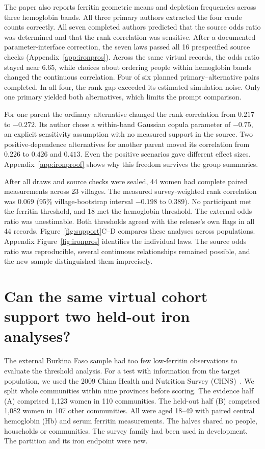 \documentclass[sigconf,anonymous,review]{acmart}
\begin{document}
The paper also reports ferritin geometric means and depletion frequencies across three hemoglobin bands. All three primary authors extracted the four crude counts correctly. All seven completed authors predicted that the source odds ratio was determined and that the rank correlation was sensitive. After a documented parameter-interface correction, the seven laws passed all 16 prespecified source checks (Appendix~\ref{app:ironpros}). Across the same virtual records, the odds ratio stayed near 6.65, while choices about ordering people within hemoglobin bands changed the continuous correlation. Four of six planned primary--alternative pairs completed. In all four, the rank gap exceeded its estimated simulation noise. Only one primary yielded both alternatives, which limits the prompt comparison.


For one parent the ordinary alternative changed the rank correlation from $0.217$ to $-0.272$. Its author chose a within-band Gaussian copula parameter of $-0.75$, an explicit sensitivity assumption with no measured support in the source. Two positive-dependence alternatives for another parent moved its correlation from $0.226$ to $0.426$ and $0.413$. Even the positive scenarios gave different effect sizes. Appendix~\ref{app:ironproof} shows why this freedom survives the group summaries.

After all draws and source checks were sealed, 44 women had complete paired measurements across 23 villages. The measured survey-weighted rank correlation was 0.069 (95\% village-bootstrap interval $-0.198$ to $0.389$). No participant met the ferritin threshold, and 18 met the hemoglobin threshold. The external odds ratio was unestimable. Both thresholds agreed with the release's own flags in all 44 records. Figure~\ref{fig:support}C--D compares these analyses across populations. Appendix Figure~\ref{fig:ironpros} identifies the individual laws. The source odds ratio was reproducible, several continuous relationships remained possible, and the new sample distinguished them imprecisely.

\section{Can the same virtual cohort support two held-out iron analyses?}
\label{sec:chns}
The external Burkina Faso sample had too few low-ferritin observations to evaluate the threshold analysis. For a test with information from the target population, we used the 2009 China Health and Nutrition Survey (CHNS)~\cite{chnsbio,chnsind}. We split whole communities within nine provinces before scoring. The evidence half (A) comprised 1,123 women in 110 communities. The held-out half (B) comprised 1,082 women in 107 other communities. All were aged 18--49 with paired central hemoglobin (Hb) and serum ferritin measurements. The halves shared no people, households or communities. The survey family had been used in development. The partition and its iron endpoint were new.
\end{document}
